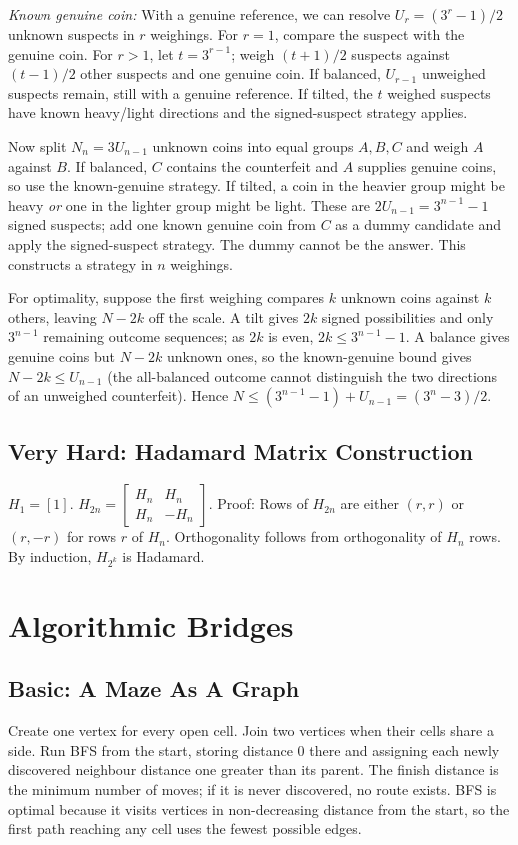 \documentclass[12pt]{article}
\begin{document}
\emph{Known genuine coin:} With a genuine reference, we can resolve
$U_r=(3^r-1)/2$ unknown suspects in $r$ weighings. For $r=1$,
compare the suspect with the genuine coin. For $r>1$, let
$t=3^{r-1}$; weigh $(t+1)/2$ suspects against $(t-1)/2$ other suspects
and one genuine coin. If balanced, $U_{r-1}$ unweighed suspects
remain, still with a genuine reference. If tilted, the $t$ weighed
suspects have known heavy/light directions and the signed-suspect
strategy applies.

Now split $N_n=3U_{n-1}$ unknown coins into equal groups $A,B,C$
and weigh $A$ against $B$. If balanced, $C$ contains the counterfeit
and $A$ supplies genuine coins, so use the known-genuine strategy.
If tilted, a coin in the heavier group might be heavy \emph{or} one
in the lighter group might be light. These are $2U_{n-1}=3^{n-1}-1$
signed suspects; add one known genuine coin from $C$ as a dummy
candidate and apply the signed-suspect strategy. The dummy cannot be
the answer. This constructs a strategy in $n$ weighings.

For optimality, suppose the first weighing compares $k$ unknown
coins against $k$ others, leaving $N-2k$ off the scale. A tilt gives
$2k$ signed possibilities and only $3^{n-1}$ remaining outcome
sequences; as $2k$ is even, $2k\le3^{n-1}-1$. A balance gives genuine
coins but $N-2k$ unknown ones, so the known-genuine bound gives
$N-2k\le U_{n-1}$ (the all-balanced outcome cannot distinguish the
two directions of an unweighed counterfeit). Hence
$N\le(3^{n-1}-1)+U_{n-1}=(3^n-3)/2$.

\subsection*{Very Hard: Hadamard Matrix Construction}
$H_1=[1]$. $H_{2n}=
\begin{bmatrix}H_n & H_n\\H_n & -H_n
\end{bmatrix}$.
Proof: Rows of $H_{2n}$ are either $(r,r)$ or $(r,-r)$ for rows $r$
of $H_n$. Orthogonality follows from orthogonality of $H_n$ rows. By
induction, $H_{2^k}$ is Hadamard.

\section{Algorithmic Bridges}

\subsection*{Basic: A Maze As A Graph}
Create one vertex for every open cell. Join two vertices when their
cells share a side. Run BFS from the start, storing distance 0 there
and assigning each newly discovered neighbour distance one greater
than its parent. The finish distance is the minimum number of moves;
if it is never discovered, no route exists. BFS is optimal because it
visits vertices in non-decreasing distance from the start, so the
first path reaching any cell uses the fewest possible edges.
\end{document}
